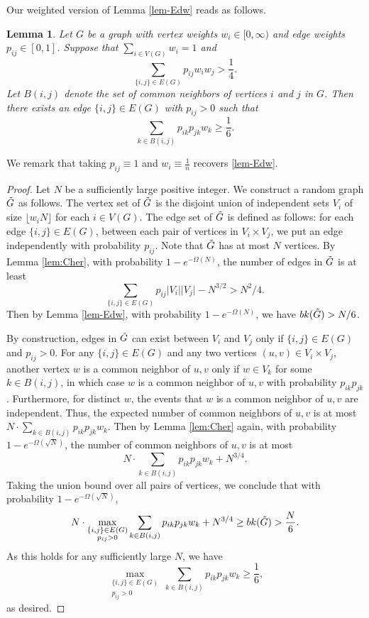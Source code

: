 \documentclass[11pt,a4paper]{article}
\newtheorem{lemma}[theorem]{Lemma}
\theoremstyle{definition}
\theoremstyle{remark}
\newcommand{\floor}[1]{\lfloor #1\rfloor}
\newcommand*{\abs}[1]{\lvert#1\rvert}
\begin{document}
Our weighted version of Lemma \ref{lem-Edw} reads as follows.
\begin{lemma}
    \label{lem:Edwards-Blowup}
    Let $G$ be a graph with vertex weights $w_i \in [0, \infty)$ and edge weights $p_{ij} \in [0, 1]$. Suppose that $\sum_{i\in V(G)} w_i = 1$ and 
    $$\sum_{\{i,j\} \in E(G)} p_{ij}w_i w_j > \frac{1}{4}.$$
    Let $B(i, j)$ denote the set of common neighbors of vertices $i$ and $j$ in $G$. Then there exists an edge $\{i,j\} \in E(G)$ with $p_{ij} > 0$ such that
    $$\sum_{k \in B(i, j)} p_{ik} p_{jk} w_k \geq \frac{1}{6}.$$
\end{lemma}
We remark that taking $p_{ij} \equiv 1$ and $w_i \equiv \frac{1}{n}$ recovers \cref{lem-Edw}.

\begin{proof}
    Let $N$ be a sufficiently large positive integer. We construct a random graph $\Tilde{G}$ as follows. The vertex set of $\Tilde{G}$ is the disjoint union of independent sets $V_i$ of size $\floor{w_i N}$ for each $i \in V(G)$. The edge set of 
    $\Tilde{G}$ is defined as follows: for each edge $\{i,j\} \in E(G)$, between each pair of vertices in $V_i \times V_j$, we put an edge independently with probability $p_{ij}$. Note that $\Tilde{G}$ has at most $N$ vertices. By Lemma \ref{lem:Cher}, with probability $1 - e^{-\Omega(N)}$, the number of edges in $\Tilde{G}$ is at least 
    $$\sum_{\{i,j\} \in E(G)} p_{ij} \abs{V_i} \abs{V_j} - N^{3/2} > {N^2}/{4}.$$
    Then by Lemma \ref{lem-Edw}, with probability $1 - e^{-\Omega(N)}$, we have $bk(\Tilde{G}) > {N}/{6}$.
    
    By construction, edges in $\Tilde{G}$ can exist between $V_i$ and $V_j$ only if $\{i,j\} \in E(G)$ and $ p_{ij} > 0$. 
    For any $\{i,j\} \in E(G)$ and any two vertices $(u, v) \in V_i \times V_j$, another vertex $w$ is a common neighbor of $u, v$ only if $w \in V_k$ for some $k \in B(i, j)$, in which case $w$ is a common neighbor of $u, v$ with probability $p_{ik} p_{jk}$. Furthermore, for distinct $w$, the events that $w$ is a common neighbor of $u, v$ are independent. Thus, the expected number of common neighbors of $u, v$ is at most $N \cdot \sum_{k \in B(i, j)} p_{ik} p_{jk} w_k$. Then by Lemma \ref{lem:Cher} again, with probability $1 - e^{-\Omega(\sqrt{N})}$, the number of common neighbors of $u, v$ is at most 
    $$N \cdot \sum_{k \in B(i, j)} p_{ik} p_{jk} w_k + N^{3/4}.$$
    Taking the union bound over all pairs of vertices, we conclude that with probability $1 - e^{-\Omega(\sqrt{N})}$, 
    $$N \cdot \max_{\substack{ \{i,j\} \in E(G)\\ p_{ij} > 0}} \sum_{k \in B(i, j)} p_{ik} p_{jk} w_k + N^{3/4} \ge bk(\Tilde{G})>  \frac{N}{6}.$$
    As this holds for any sufficiently large $N$, we have
    $$\max_{\substack{\{i,j\} \in E(G)\\ p_{ij}> 0}} \sum_{k \in B(i, j)} p_{ik} p_{jk} w_k \geq \frac{1}{6}, $$
    as desired.
\end{proof}
\end{document}
